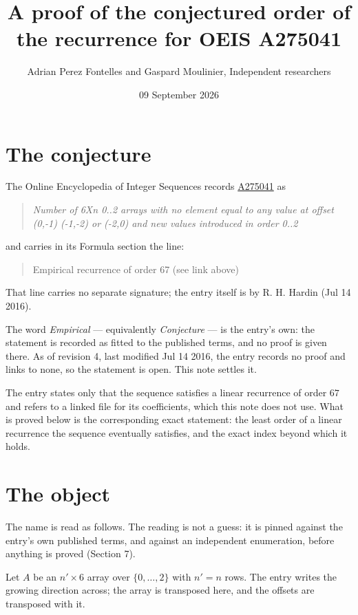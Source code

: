 \documentclass[11pt]{article}
\title{A proof of the conjectured order of the recurrence for OEIS A275041}
\author{Adrian Perez Fontelles and Gaspard Moulinier, Independent researchers}
\date{09 September 2026}
\theoremstyle{definition}
\begin{document}
\maketitle
\section{The conjecture}

The Online Encyclopedia of Integer Sequences records \href{https://oeis.org/A275041}{A275041} as

\begin{quote}\itshape Number of 6Xn 0..2 arrays with no element equal to any value at offset (0,-1) (-1,-2) or (-2,0) and new values introduced in order 0..2\end{quote}

and carries in its Formula section the line:

\begin{quote}\ttfamily Empirical recurrence of order 67 (see link above)\end{quote}

That line carries no separate signature; the entry itself is by R. H. Hardin (Jul 14 2016).

The word {\itshape Empirical} --- equivalently {\itshape Conjecture} --- is the entry's own: the statement is recorded as fitted to the published terms, and no proof is given there. As of revision 4, last modified Jul 14 2016, the entry records no proof and links to none, so the statement is open. This note settles it.

The entry states only that the sequence satisfies a linear recurrence of order $67$ and refers to a linked file for its coefficients, which this note does not use. What is proved below is the corresponding exact statement: the least order of a linear recurrence the sequence eventually satisfies, and the exact index beyond which it holds.

\section{The object}

The name is read as follows. The reading is not a guess: it is pinned against the entry's own published terms, and against an independent enumeration, before anything is proved (Section 7).

Let $A$ be an $n' \times 6$ array over $\{0,\dots,2\}$ with $n' = n$ rows. The entry writes the growing direction across; the array is transposed here, and the offsets are transposed with it.
\end{document}
